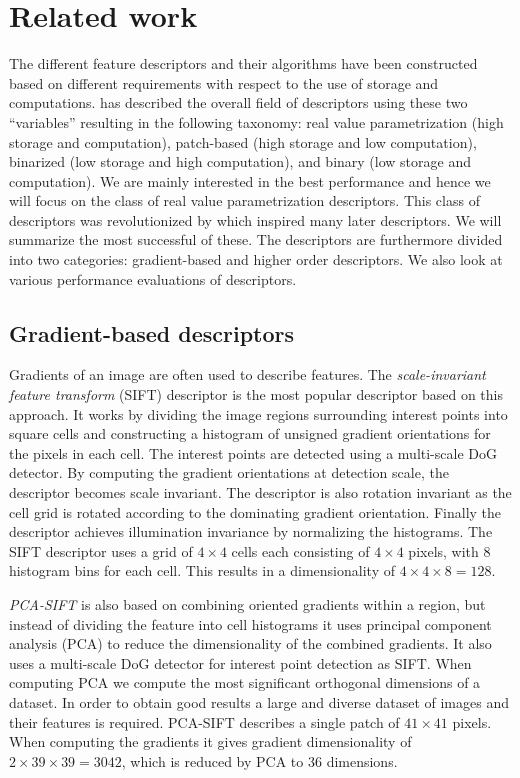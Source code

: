 \documentclass[../thesis.tex]{subfiles}
\begin{document}
\section{Related work}
The different feature descriptors and their algorithms have been constructed
based on different requirements with respect to the use of storage and
computations. \cite{heinly2012comparative} has described the overall field of
descriptors using these two ``variables'' resulting in the following taxonomy:
real value parametrization (high storage and computation), patch-based (high
storage and low computation), binarized (low storage and high computation),
and binary (low storage and computation). We are mainly interested
in the best performance and hence we will focus on the class of real value
parametrization descriptors.
This class of descriptors was revolutionized by \cite{lowe2004distinctive}
which inspired many later descriptors. We will summarize the most successful
of these. The descriptors are furthermore divided into two categories:
gradient-based and higher order descriptors. We also look at various
performance evaluations of descriptors.

\subsection{Gradient-based descriptors}
Gradients of an image are often used to describe features.
The \emph{scale-invariant feature transform} (SIFT) descriptor
\cite{lowe2004distinctive} is the most popular descriptor based on this
approach. It works by dividing the image regions surrounding interest
points into square cells and constructing a histogram of unsigned gradient
orientations for the pixels in each cell. The interest points are detected
using a multi-scale DoG detector. By computing the gradient orientations
at detection scale, the descriptor becomes scale invariant. The descriptor
is also rotation invariant as the cell grid is rotated according to the
dominating gradient orientation. Finally the descriptor achieves illumination
invariance by normalizing the histograms. The SIFT descriptor uses a grid of
$4 \times 4$ cells each consisting of $4 \times 4$ pixels, with 8 histogram
bins for each cell. This results in a dimensionality of $4 \times 4 \times 8 =
128$.

\emph{PCA-SIFT} \cite{ke2004pca} is also based on combining oriented gradients
within a region, but instead of dividing the feature into cell histograms
it uses principal component analysis (PCA) to reduce the dimensionality
of the combined gradients. It also uses a multi-scale DoG detector for
interest point detection as SIFT. When computing PCA we compute the most
significant orthogonal dimensions of a dataset. In order to obtain good
results a large and diverse dataset of images and their features is required.
PCA-SIFT describes a single patch of $41 \times 41$ pixels. When computing
the gradients it gives gradient dimensionality of $2\times39\times39 = 3042$,
which is reduced by PCA to 36 dimensions.
\end{document}
